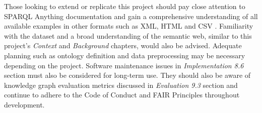 Those looking to extend or replicate this project should pay close attention to SPARQL Anything \cite{sparqlanythinggithub} documentation and gain a comprehensive understanding of all available examples in other formats such as XML, HTML \cite{asprino2023knowledge} and CSV \cite{rattaknowledge}. Familiarity with the dataset and a broad understanding of the semantic web, similar to this project's \textit{Context} and \textit{Background} chapters, would also be advised. Adequate planning such as ontology definition and data preprocessing may be necessary depending on the project. Software maintenance issues in \textit{Implementation 8.6} section must also be considered for long-term use. They should also be aware of knowledge graph evaluation metrics discussed in \textit{Evaluation 9.3} section and continue to adhere to the Code of Conduct \cite{bcs} and FAIR Principles \cite{fairprinciples} throughout development. 
